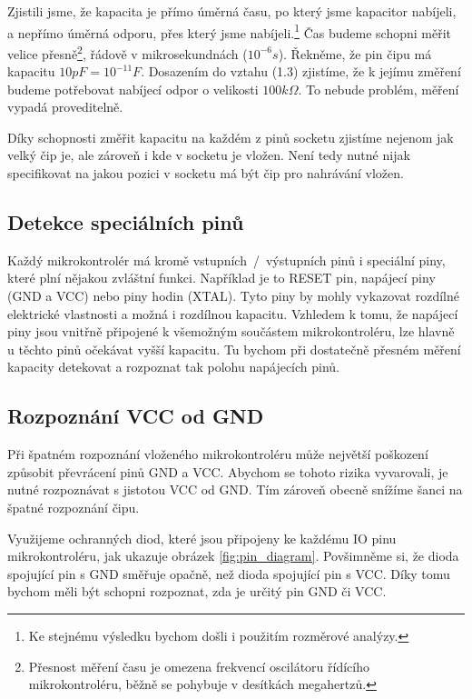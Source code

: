 \documentclass[11pt,a4paper,twoside,openright]{report}
\begin{document}
Zjistili jsme, že kapacita je přímo úměrná času, po který jsme kapacitor nabíjeli, a nepřímo úměrná odporu, přes který jsme nabíjeli.\footnote{Ke stejnému výsledku bychom došli i použitím rozměrové analýzy.} Čas budeme schopni měřit velice přesně\footnote{Přesnost měření času je omezena frekvencí oscilátoru řídícího mikrokontroléru, běžně se pohybuje v desítkách megahertzů.}, řádově v mikrosekundnách ($10^{-6} s $). Řekněme, že pin čipu má kapacitu $10 pF = 10^{-11} F$. Dosazením do vztahu (1.3) zjistíme, že k jejímu změření budeme potřebovat nabíjecí odpor o velikosti $100 k\Omega$. To nebude problém, měření vypadá proveditelně.

Díky schopnosti změřit kapacitu na každém z pinů socketu zjistíme nejenom jak velký čip je, ale zároveň i kde v socketu je vložen. Není tedy nutné nijak specifikovat na jakou pozici v socketu má být čip pro nahrávání vložen.

\subsection {Detekce speciálních pinů}

Každý mikrokontrolér má kromě vstupních~/~výstupních pinů i speciální piny, které plní nějakou zvláštní funkci. Například je to RESET pin, napájecí piny (GND a VCC) nebo piny hodin (XTAL). Tyto piny by mohly vykazovat rozdílné elektrické vlastnosti a možná i rozdílnou kapacitu. Vzhledem k tomu, že napájecí piny jsou vnitřně připojené k všemožným součástem mikrokontroléru, lze hlavně u těchto pinů očekávat vyšší kapacitu. Tu bychom při dostatečně přesném měření kapacity detekovat a rozpoznat tak polohu napájecích pinů.

\subsection {Rozpoznání VCC od GND\label{VCCvsGND}}

Při špatném rozpoznání vloženého mikrokontroléru může největší poškození způsobit převrácení pinů GND a VCC. Abychom se tohoto rizika vyvarovali, je nutné rozpoznávat s jistotou VCC od GND. Tím zároveň obecně snížíme šanci na špatné rozpoznání čipu.

Využijeme ochranných diod, které jsou připojeny ke každému IO pinu mikrokontroléru, jak ukazuje obrázek \ref{fig:pin_diagram}. Povšimněme si, že dioda spojující pin s GND směřuje opačně, než dioda spojující pin s VCC. Díky tomu bychom měli být schopni rozpoznat, zda je určitý pin GND či VCC.
\end{document}
